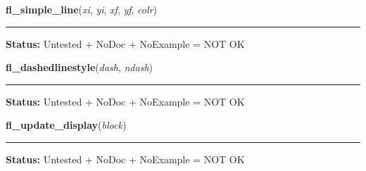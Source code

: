     \label{xformslib:library:fl_line}

    \vspace{0.5ex}

\hspace{.8\funcindent}\begin{boxedminipage}{\funcwidth}

    \raggedright \textbf{fl\_simple\_line}(\textit{xi}, \textit{yi}, \textit{xf}, \textit{yf}, \textit{colr})

    \vspace{-1.5ex}

    \rule{\textwidth}{0.5\fboxrule}
\setlength{\parskip}{2ex}
\setlength{\parskip}{1ex}
\textbf{Status:} Untested + NoDoc + NoExample = NOT OK



    \end{boxedminipage}

    \label{xformslib:library:fl_dashedlinestyle}

    \vspace{0.5ex}

\hspace{.8\funcindent}\begin{boxedminipage}{\funcwidth}

    \raggedright \textbf{fl\_dashedlinestyle}(\textit{dash}, \textit{ndash})

    \vspace{-1.5ex}

    \rule{\textwidth}{0.5\fboxrule}
\setlength{\parskip}{2ex}
\setlength{\parskip}{1ex}
\textbf{Status:} Untested + NoDoc + NoExample = NOT OK



    \end{boxedminipage}

    \label{xformslib:library:fl_update_display}

    \vspace{0.5ex}

\hspace{.8\funcindent}\begin{boxedminipage}{\funcwidth}

    \raggedright \textbf{fl\_update\_display}(\textit{block})

    \vspace{-1.5ex}

    \rule{\textwidth}{0.5\fboxrule}
\setlength{\parskip}{2ex}
\setlength{\parskip}{1ex}
\textbf{Status:} Untested + NoDoc + NoExample = NOT OK



    \end{boxedminipage}

